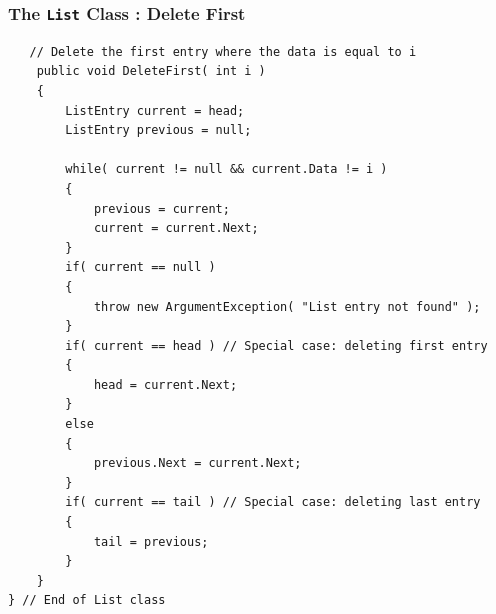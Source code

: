 \begin{frame}[fragile]
\frametitle{The \texttt{List} Class : Delete First}

{\tiny
\begin{verbatim}
   // Delete the first entry where the data is equal to i
    public void DeleteFirst( int i )
    {
        ListEntry current = head;
        ListEntry previous = null;

        while( current != null && current.Data != i )
        {
            previous = current;
            current = current.Next;
        }
        if( current == null )
        {
            throw new ArgumentException( "List entry not found" );
        }
        if( current == head ) // Special case: deleting first entry
        {
            head = current.Next;
        }
        else
        {
            previous.Next = current.Next;
        }
        if( current == tail ) // Special case: deleting last entry
        {
            tail = previous;
        }
    }
} // End of List class
\end{verbatim}
}

\end{frame}


